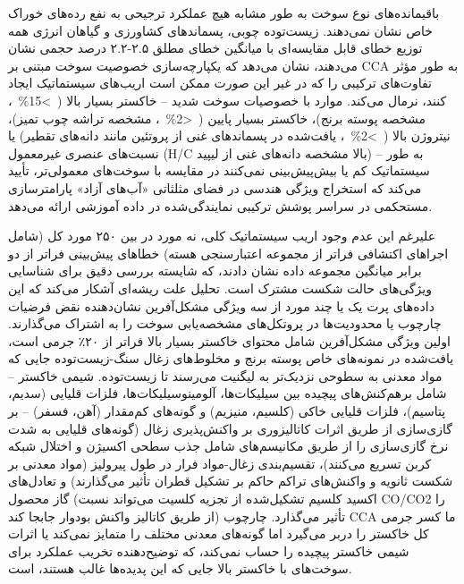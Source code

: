 \documentclass[12pt, a4paper]{article}
\begin{document}
باقیمانده‌های نوع سوخت به طور مشابه هیچ عملکرد ترجیحی به نفع رده‌های خوراک خاص نشان نمی‌دهند. زیست‌توده چوبی، پسماندهای کشاورزی و گیاهان انرژی همه توزیع خطای قابل مقایسه‌ای با میانگین خطای مطلق ۲.۵-۲.۲ درصد حجمی نشان می‌دهند، نشان می‌دهد که یکپارچه‌سازی خصوصیت سوخت مبتنی بر CCA به طور مؤثر تفاوت‌های ترکیبی را که در غیر این صورت ممکن است اریب‌های سیستماتیک ایجاد کنند، نرمال می‌کند. موارد با خصوصیات سوخت شدید – خاکستر بسیار بالا ( >15\% ، مشخصه پوسته برنج)، خاکستر بسیار پایین ( <2\% ، مشخصه تراشه چوب تمیز)، نیتروژن بالا ( >2\% ، یافت‌شده در پسماندهای غنی از پروتئین مانند دانه‌های تقطیر) یا نسبت‌های عنصری غیرمعمول (H/C بالا مشخصه دانه‌های غنی از لیپید) – به طور سیستماتیک کم‌ یا بیش‌پیش‌بینی نمی‌کنند در مقایسه با سوخت‌های معمولی‌تر، تأیید می‌کند که استخراج ویژگی هندسی در فضای مثلثاتی «آب‌های آزاد» پارامترسازی مستحکمی در سراسر پوشش ترکیبی نمایندگی‌شده در داده آموزشی ارائه می‌دهد.

علیرغم این عدم وجود اریب سیستماتیک کلی، نه مورد در بین ۲۵۰ مورد کل (شامل اجراهای اکتشافی فراتر از مجموعه اعتبارسنجی هسته) خطاهای پیش‌بینی فراتر از دو برابر میانگین مجموعه داده نشان دادند، که شایسته بررسی دقیق برای شناسایی ویژگی‌های حالت شکست مشترک است. تحلیل علت ریشه‌ای آشکار می‌کند که این داده‌های پرت یک یا چند مورد از سه ویژگی مشکل‌آفرین نشان‌دهنده نقض فرضیات چارچوب یا محدودیت‌ها در پروتکل‌های مشخصه‌یابی سوخت را به اشتراک می‌گذارند. اولین ویژگی مشکل‌آفرین شامل محتوای خاکستر بسیار بالا فراتر از ۲۰٪ جرمی است، یافت‌شده در نمونه‌های خاص پوسته برنج و مخلوط‌های زغال سنگ-زیست‌توده جایی که مواد معدنی به سطوحی نزدیک‌تر به لیگنیت می‌رسند تا زیست‌توده. شیمی خاکستر – شامل برهم‌کنش‌های پیچیده بین سیلیکات‌ها، آلومینوسیلیکات‌ها، فلزات قلیایی (سدیم، پتاسیم)، فلزات قلیایی خاکی (کلسیم، منیزیم) و گونه‌های کم‌مقدار (آهن، فسفر) – بر گازی‌سازی از طریق اثرات کاتالیزوری بر واکنش‌پذیری زغال (گونه‌های قلیایی به شدت نرخ گازی‌سازی را از طریق مکانیسم‌های شامل جذب سطحی اکسیژن و اختلال شبکه کربن تسریع می‌کنند)، تقسیم‌بندی زغال-مواد فرار در طول پیرولیز (مواد معدنی بر شکست ثانویه و واکنش‌های تراکم حاکم بر تشکیل قطران تأثیر می‌گذارند) و تعادل‌های گاز محصول (اکسید کلسیم تشکیل‌شده از تجزیه کلسیت می‌تواند نسبت CO/CO2 را از طریق کاتالیز واکنش بودوار جابجا کند) تأثیر می‌گذارد. چارچوب CCA ما کسر جرمی کل خاکستر را دربر می‌گیرد اما گونه‌های معدنی مختلف را متمایز نمی‌کند یا اثرات شیمی خاکستر پیچیده را حساب نمی‌کند، که توضیح‌دهنده تخریب عملکرد برای سوخت‌های با خاکستر بالا جایی که این پدیده‌ها غالب هستند، است.
\end{document}
